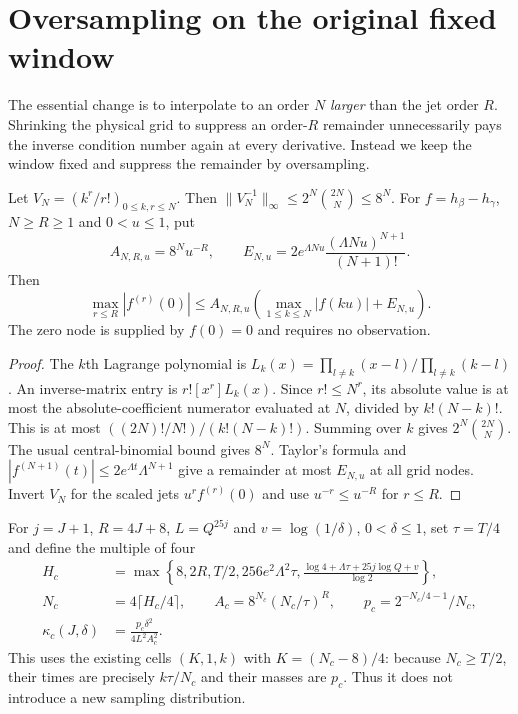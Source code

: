 \section{Oversampling on the original fixed window}
\label{sec:compact}
The essential change is to interpolate to an order $N$ \emph{larger} than the
jet order $R$. Shrinking the physical grid to suppress an order-$R$ remainder
unnecessarily pays the inverse condition number again at every derivative.
Instead we keep the window fixed and suppress the remainder by oversampling.

\begin{lemma}
\label{lem:grid}
Let $V_N=(k^r/r!)_{0\le k,r\le N}$. Then
$\|V_N^{-1}\|_\infty\le2^N\binom{2N}{N}\le8^N$.
For $f=h_\beta-h_\gamma$, $N\ge R\ge1$ and $0<u\le1$, put
\[
 A_{N,R,u}=8^N u^{-R},\qquad
 E_{N,u}=2e^{\Lambda Nu}\frac{(\Lambda Nu)^{N+1}}{(N+1)!}.
\]
Then
\begin{equation}
 \max_{r\le R}|f^{(r)}(0)|\le
 A_{N,R,u}\left(\max_{1\le k\le N}|f(ku)|+E_{N,u}\right).
 \label{eq:oversample}
\end{equation}
The zero node is supplied by $f(0)=0$ and requires no observation.
\end{lemma}
\begin{proof}
The $k$th Lagrange polynomial is
$L_k(x)=\prod_{l\ne k}(x-l)/\prod_{l\ne k}(k-l)$.
An inverse-matrix entry is $r![x^r]L_k(x)$. Since $r!\le N^r$, its absolute
value is at most the absolute-coefficient numerator evaluated at $N$, divided
by $k!(N-k)!$. This is at most
$((2N)!/N!)/(k!(N-k)!)$. Summing over $k$ gives
$2^N\binom{2N}{N}$. The usual central-binomial bound gives $8^N$.
Taylor's formula and $|f^{(N+1)}(t)|\le2e^{\Lambda t}\Lambda^{N+1}$ give a
remainder at most $E_{N,u}$ at all grid nodes. Invert $V_N$ for the scaled
jets $u^r f^{(r)}(0)$ and use $u^{-r}\le u^{-R}$ for $r\le R$.
\end{proof}

For $j=J+1$, $R=4J+8$, $L=Q^{25j}$ and $v=\log(1/\delta)$,
$0<\delta\le1$, set $\tau=T/4$ and define the multiple of four
\begin{equation}
\begin{split}
 H_c&=\max\left\{8,2R,T/2,256e^2\Lambda^2\tau,
 \frac{\log4+\Lambda\tau+25j\log Q+v}{\log2}\right\},\\
 N_c&=4\lceil H_c/4\rceil,\qquad
 A_c=8^{N_c}(N_c/\tau)^R,\qquad
 p_c=2^{-N_c/4-1}/N_c,\\
 \kappa_c(J,\delta)&=\frac{p_c\delta^2}{4L^2 A_c^2}.
\end{split}\label{eq:compact-certificate}
\end{equation}
This uses the existing cells $(K,1,k)$ with $K=(N_c-8)/4$: because
$N_c\ge T/2$, their times are precisely $k\tau/N_c$ and their masses are
$p_c$. Thus it does not introduce a new sampling distribution.

